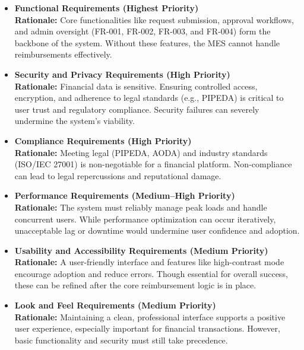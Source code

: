 \documentclass[12pt]{article}
\begin{document}
\begin{itemize}

    \item \textbf{Functional Requirements (Highest Priority)} \\
    \textbf{Rationale:} Core functionalities like request submission, approval workflows, and admin oversight (FR-001, FR-002, FR-003, and FR-004) form the backbone of the system. Without these features, the MES cannot handle reimbursements effectively.

    \item \textbf{Security and Privacy Requirements (High Priority)} \\
    \textbf{Rationale:} Financial data is sensitive. Ensuring controlled access, encryption, and adherence to legal standards (e.g., PIPEDA) is critical to user trust and regulatory compliance. Security failures can severely undermine the system’s viability.

    \item \textbf{Compliance Requirements (High Priority)} \\
    \textbf{Rationale:} Meeting legal (PIPEDA, AODA) and industry standards (ISO/IEC 27001) is non-negotiable for a financial platform. Non-compliance can lead to legal repercussions and reputational damage.

    \item \textbf{Performance Requirements (Medium–High Priority)} \\
    \textbf{Rationale:} The system must reliably manage peak loads and handle concurrent users. While performance optimization can occur iteratively, unacceptable lag or downtime would undermine user confidence and adoption.

    \item \textbf{Usability and Accessibility Requirements (Medium Priority)} \\
    \textbf{Rationale:} A user-friendly interface and features like high-contrast mode encourage adoption and reduce errors. Though essential for overall success, these can be refined after the core reimbursement logic is in place.

    \item \textbf{Look and Feel Requirements (Medium Priority)} \\
    \textbf{Rationale:} Maintaining a clean, professional interface supports a positive user experience, especially important for financial transactions. However, basic functionality and security must still take precedence.


\end{itemize}
\end{document}
